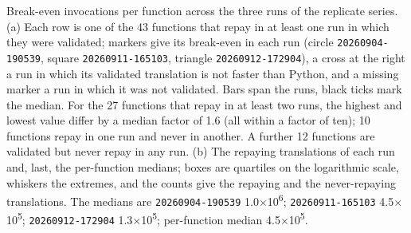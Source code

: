 \caption{Break-even invocations per function across the three runs of the replicate series. (a) Each row is one of the
  43 functions that repay in at least one run in which they were validated; markers
  give its break-even in each run (circle \texttt{20260904-190539}, square \texttt{20260911-165103}, triangle \texttt{20260912-172904}), a cross at the right a run in which its
  validated translation is not faster than Python, and a missing marker a run in which it
  was not validated. Bars span the runs, black ticks mark the median. For the 27 functions that repay in at least two runs, the highest and lowest value differ by a median factor of 1.6 (all within a factor of ten); 10 functions repay in one run and never in another. A further
  12 functions are validated but never repay in any run. (b) The repaying
  translations of each run and, last, the per-function medians; boxes are quartiles on the logarithmic scale, whiskers
  the extremes, and the counts give the repaying and the never-repaying translations. The
  medians are \texttt{20260904-190539} 1.0$\times$10\textsuperscript{6}; \texttt{20260911-165103} 4.5$\times$10\textsuperscript{5}; \texttt{20260912-172904} 1.3$\times$10\textsuperscript{5}; per-function median 4.5$\times$10\textsuperscript{5}.}
